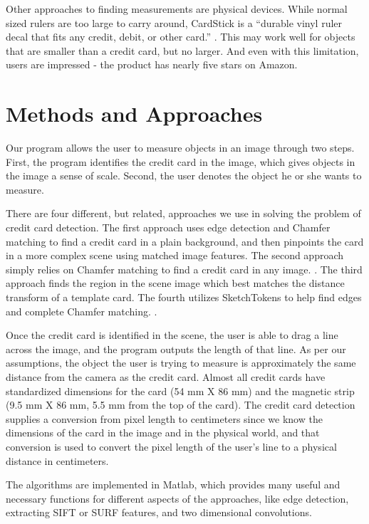\documentclass[10pt,twocolumn,letterpaper]{article}
\begin{document}
Other approaches to finding measurements are physical devices. While normal sized rulers are too large to carry around, CardStick is a “durable vinyl ruler decal that fits any credit, debit, or other card.” \cite{CardStick}. This may work well for objects that are smaller than a credit card, but no larger. And even with this limitation, users are impressed - the product has nearly five stars on Amazon.

\section{Methods and Approaches}
Our program allows the user to measure objects in an image through two steps. First, the program identifies the credit card in the image, which gives objects in the image a sense of scale. Second, the user denotes the object he or she wants to measure. 

There are four different, but related, approaches we use in solving the problem of credit card detection. The first approach uses edge detection and Chamfer matching to find a credit card in a plain background, and then pinpoints the card in a more complex scene using matched image features. The second approach simply relies on Chamfer matching to find a credit card in any image. \cite{chamfer}. The third approach finds the region in the scene image which best matches the distance transform of a template card. The fourth utilizes SketchTokens to help find edges and complete Chamfer matching. \cite{SketchTokens}. 

Once the credit card is identified in the scene, the user is able to drag a line across the image, and the program outputs the length of that line. As per our assumptions, the object the user is trying to measure is approximately the same distance from the camera as the credit card. Almost all credit cards have standardized dimensions for the card (54 mm X 86 mm) and the magnetic strip (9.5 mm X 86 mm, 5.5 mm from the top of the card). The credit card detection supplies a conversion from pixel length to centimeters since we know the dimensions of the card in the image and in the physical world, and that conversion is used to convert the pixel length of the user’s line to a physical distance in centimeters. 

	The algorithms are implemented in Matlab, which provides many useful and necessary functions for different aspects of the approaches, like edge detection, extracting SIFT or SURF features, and two dimensional convolutions.  
\end{document}
